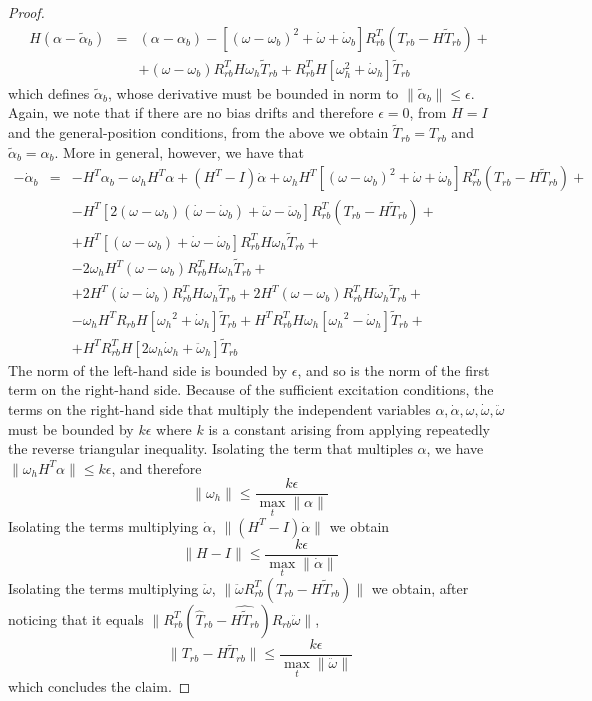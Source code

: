 \documentclass[]{article}
\def\w{\omega}
\begin{document}
\begin{proof}
\begin{eqnarray}
H(\alpha-\tilde \alpha_b) &=& (\alpha - \alpha_b) - [(\w - \w_b)^2 + \dot \w + \dot \w_b]R_{rb}^T(T_{rb}-H\tilde T_{rb}) +\\
&& + (\w-\w_b)R_{rb}^TH\w_h\tilde T_{rb} +  R_{rb}^TH[\w_h^2+\dot \w_h]\tilde T_{rb}
\end{eqnarray}
which defines $\tilde \alpha_b$, whose derivative must be bounded in norm to $\| \tilde \alpha_b \| \le \epsilon$. Again, we note that if there are no bias drifts and therefore $\epsilon = 0$, from $H = I$ and the general-position conditions, from the above we obtain $\tilde T_{rb} = T_{rb}$ and $\tilde \alpha_b = \alpha_b$. More in general, however, we have that
\begin{eqnarray}
-\dot \alpha_b &=& -H^T\alpha_b - \w_h H^T\alpha + (H^T-I)\dot \alpha + \w_h H^T[(\w-\w_b)^2 + \dot \w + \dot \w_b]R_{rb}^T(T_{rb}-H\tilde T_{rb}) + \\
&& - H^T[2(\w-\w_b)(\dot \w - \dot \w_b) + \ddot \w - \ddot \w_b]R_{rb}^T(T_{rb}-H\tilde T_{rb}) + \\
&& + H^T[(\w - \w_b) + \dot \w - \dot \w_b] R_{rb}^TH\w_h\tilde T_{rb} + \\
&& -2\w_hH^T(\w-\w_b)R_{rb}^TH\w_h \tilde T_{rb} + \\
&& + 2H^T(\dot \w - \dot \w_b)R_{rb}^TH \w_h \tilde T_{rb} + 2H^T(\w-\w_b)R_{rb}^TH \dot \w_h \tilde T_{rb} + \\
&& - \w_h H^TR_{rb}H[{\w_h}^2+\dot \w_h]\tilde T_{rb} + H^T R_{rb}^TH\w_h[{\w_h}^2 - \dot \w_h]\tilde T_{rb} + \\
&& + H^T R_{rb}^T H[2\w_h \dot \w_h + \ddot \w_h]\tilde T_{rb}
\end{eqnarray}
The norm of the left-hand side is bounded by $\epsilon$, and so is the norm of the first term on the right-hand side. Because of the sufficient excitation conditions, the terms on the right-hand side that multiply the independent variables $\alpha, \dot \alpha, \w, \dot \w, \ddot \w$ must be bounded by $k \epsilon$ where $k$ is a constant arising from applying repeatedly the reverse triangular inequality. Isolating the term that multiples $\alpha$, we have $\|\w_h H^T \alpha \| \le k \epsilon$, and therefore
\begin{equation}
\| \w_h \| \le \frac{k \epsilon}{\max_t \| \alpha \|}
\end{equation}
Isolating the terms multiplying $\dot \alpha$, $\| (H^T - I )\dot \alpha \|$ we obtain
\begin{equation}
\| H - I \| \le \frac{k \epsilon}{\max_t \| \dot \alpha \|}
\end{equation}
Isolating the terms multiplying $\ddot \w$, $\| \ddot \w R_{rb}^T(T_{rb} - H \tilde T_{rb}) \|$ we obtain, after noticing that it equals $\| R_{rb}^T(\widehat T_{rb} - \widehat{H\tilde T_{rb}})R_{rb}\ddot \w \|$, 
\begin{equation}
\| T_{rb} - H \tilde T_{rb} \| \le \frac{k \epsilon}{\max_t \| \ddot \w\|}
 \end{equation}
which concludes the claim.
\end{proof}
\end{document}
